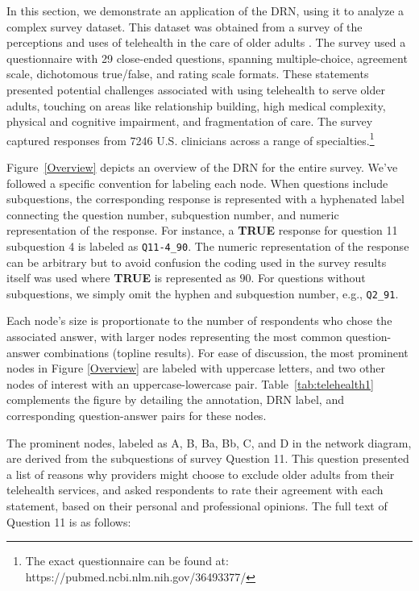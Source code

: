 In this section, we demonstrate an application of the DRN, using it to analyze a complex survey dataset. This dataset was obtained from a survey of the perceptions and uses of telehealth in the care of older adults \cite{wardlow2022perceptions}. The survey used a questionnaire with 29 close-ended questions, spanning multiple-choice, agreement scale, dichotomous true/false, and rating scale formats. These statements presented potential challenges associated with using telehealth to serve older adults, touching on areas like relationship building, high medical complexity, physical and cognitive impairment, and fragmentation of care. The survey captured responses from 7246 U.S. clinicians across a range of specialties.\footnote{The exact questionnaire can be found at:\ \hspace*{2em} https://pubmed.ncbi.nlm.nih.gov/36493377/}

Figure~\ref{Overview} depicts an overview of the DRN for the entire survey. We've followed a specific convention for labeling each node. When questions include subquestions, the corresponding response is represented with a hyphenated label connecting the question number, subquestion number, and numeric representation of the response. For instance, a \textbf{TRUE} response for question 11 subquestion 4 is labeled as \texttt{Q11-4\_90}. The numeric representation of the response can be arbitrary but to avoid confusion the coding used in the survey results itself was used where  \textbf{TRUE} is represented as $90$. For questions without subquestions, we simply omit the hyphen and subquestion number, e.g., \texttt{Q2\_91}.

Each node's size is proportionate to the number of respondents who chose the associated answer, with larger nodes representing the most common question-answer combinations (topline results). For ease of discussion, the most prominent nodes in Figure \ref{Overview} are labeled with uppercase letters, and two other nodes of interest with an uppercase-lowercase pair. Table~\ref{tab:telehealth1} complements the figure by detailing the annotation, DRN label, and corresponding question-answer pairs for these nodes.

The prominent nodes, labeled as A, B, Ba, Bb, C, and D in the network diagram, are derived from the subquestions of survey Question 11. This question presented a list of reasons why providers might choose to exclude older adults from their telehealth services, and asked respondents to rate their agreement with each statement, based on their personal and professional opinions. The full text of Question 11 is as follows:

